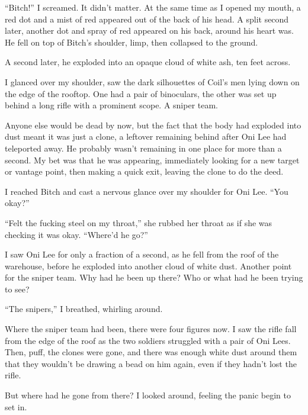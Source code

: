 ``Bitch!'' I screamed.  It didn't matter.  At the same time as I opened my mouth, a red dot and a mist of red appeared out of the back of his head.  A split second later, another dot and spray of red appeared on his back, around his heart was.  He fell on top of Bitch's shoulder, limp, then collapsed to the ground.



A second later, he exploded into an opaque cloud of white ash, ten feet across.



I glanced over my shoulder, saw the dark silhouettes of Coil's men lying down on the edge of the rooftop.  One had a pair of binoculars, the other was set up behind a long rifle with a prominent scope.  A sniper team.



Anyone else would be dead by now, but the fact that the body had exploded into dust meant it was just a clone, a leftover remaining behind after Oni Lee had teleported away.  He probably wasn't remaining in one place for more than a second.  My bet was that he was appearing, immediately looking for a new target or vantage point, then making a quick exit, leaving the clone to do the deed.



I reached Bitch and cast a nervous glance over my shoulder for Oni Lee. ``You okay?''



``Felt the fucking steel on my throat,'' she rubbed her throat as if she was checking it was okay.  ``Where'd he go?''



I saw Oni Lee for only a fraction of a second, as he fell from the roof of the warehouse, before he exploded into another cloud of white dust.  Another point for the sniper team.  Why had he been up there?  Who or what had he been trying to see?



``The snipers,'' I breathed, whirling around.



Where the sniper team had been, there were four figures now.  I saw the rifle fall from the edge of the roof as the two soldiers struggled with a pair of Oni Lees.  Then, puff, the clones were gone, and there was enough white dust around them that they wouldn't be drawing a bead on him again, even if they hadn't lost the rifle.



But where had he gone from there?  I looked around, feeling the panic begin to set in.



